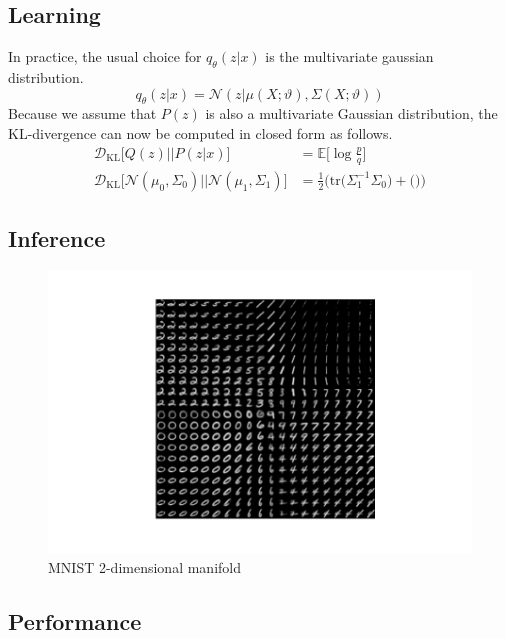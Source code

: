 \subsection{Learning}
\label{sub:vae_learning}
In practice, the usual choice for $q_\theta(z|x)$ is the multivariate gaussian distribution.
$$
q_\theta(z|x) = \mathcal{N}(z|\mu(X;\vartheta), \Sigma(X;\vartheta))
$$
Because we assume that $P(z)$ is also a multivariate Gaussian distribution, the KL-divergence can now be computed in closed form as follows\cite{derivations:2007}.
\begin{align*}
  \mathcal{D}_{\mathrm{KL}}\big[Q(z) || P(z|x)\big] &= \mathbb{E}\big[\log \frac{p}{q}\big]\\
  \mathcal{D}_{\mathrm{KL}}\big[\mathcal{N}(\mu_0,\Sigma_0) || \mathcal{N}(\mu_1,\Sigma_1)\big]
  &= \frac{1}{2} \big(\mathrm{tr}\big(\Sigma_1^{-1}\Sigma_0\big) + \big(\big)\big)
\end{align*}


\subsection{Inference}
\label{sub:vae_inference}
\begin{figure}[htb]
\centering
\includegraphics{media/manifold.pdf}
  \caption{MNIST 2-dimensional manifold}\label{fig:vae_manifold}
\end{figure}

\subsection{Performance}
\label{sub:vae_performance}

